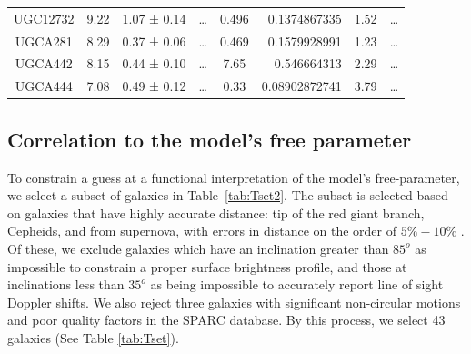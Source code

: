 \documentclass[reprint,%
 amsmath,amssymb,
 aps,
]{revtex4-1}
\begin{document}
\begin{table}[]
\begin{tabular}{cccccrrc}
\rowcolor[HTML]{F3F3F3} 
UGC12732             & 9.22                      & 1.07 ± 0.14           & …                      & 0.496                                                        & 0.1374867335                                                          & 1.52                                                          & …                                                             \\
\rowcolor[HTML]{F3F3F3} 
UGCA281              & 8.29                      & 0.37 ± 0.06           & …                      & 0.469                                                        & 0.1579928991                                                          & 1.23                                                            & …                                                             \\
\rowcolor[HTML]{F3F3F3} 
UGCA442              & 8.15                      & 0.44 ± 0.10           & …                      & 7.65                                                         & 0.546664313                                                           & 2.29                                                           & …                                                             \\
\rowcolor[HTML]{F3F3F3} 
UGCA444              & 7.08                      & 0.49 ± 0.12           & …                      & 0.33                                                         & 0.08902872741                                                         & 3.79                                                           & …                                                            
\end{tabular}
\label{table:M2L}
\end{table}
\subsection{Correlation to  the model's free parameter }

To constrain a guess at a functional interpretation of the model's free-parameter, we select a
  subset of galaxies in Table~\ref{tab:Tset2}. The  subset is selected based on
   galaxies that have highly accurate distance:   tip of the red giant branch,  Cepheids, and  from supernova, with errors in distance on the order of $5\% - 10\%$ \cite{2016Lelli}. Of these, we   exclude galaxies  which have an inclination greater than $85^o$ as impossible to constrain a proper surface brightness profile, and those at inclinations less than $35^o$ as being impossible to accurately report line of sight Doppler shifts.  We also reject  three galaxies with significant non-circular motions and poor quality factors in the SPARC database.  
  By this process, we select 43 galaxies (See Table \ref{tab:Tset}). 
  
\end{document}
